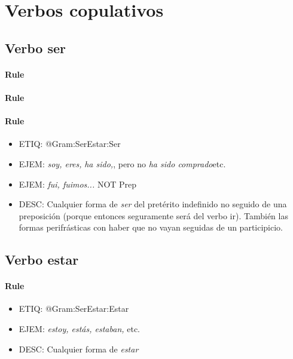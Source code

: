 \documentclass[11pt]{report}
\begin{document}
\section{Verbos copulativos}
\subsection{Verbo ser}
\paragraph*{Rule}
\paragraph*{Rule}
\paragraph*{Rule}
\begin{itemize}
\item ETIQ: @Gram:SerEstar:Ser
\item EJEM: \emph{soy, eres,} \emph{ha sido,}, pero no \emph{ha sido comprado}etc. 
\item EJEM: \emph{fui, fuimos...} NOT Prep 
\item DESC: Cualquier forma de \emph{ser} del pretérito indefinido no seguido de una preposición (porque entonces seguramente será del verbo ir). También las formas perifrásticas con haber que no vayan seguidas de un participicio.
\end{itemize}

\subsection{Verbo estar}
\paragraph*{Rule}
\begin{itemize}
\item ETIQ: @Gram:SerEstar:Estar
\item EJEM: \emph{estoy, estás, estaban,} etc. 
\item DESC: Cualquier forma de \emph{estar}
\end{itemize}
\end{document}
